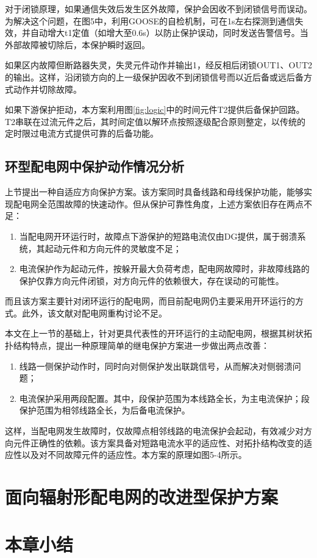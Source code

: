 对于闭锁原理，如果通信失效后发生区外故障，保护会因收不到闭锁信号而误动\cite{shengshi1981}。为解决这个问题，在图5中，利用GOOSE的自检机制，可在1s左右探测到通信失效，并自动增大t1定值（如增大至0.6s）以防止保护误动，同时发送告警信号。当外部故障被切除后，本保护瞬时返回。

如果区内故障但断路器失灵，失灵元件动作并输出1，经反相后闭锁OUT1、OUT2的输出。这样，沿闭锁方向的上一级保护因收不到闭锁信号而以近后备或远后备方式动作并切除故障。

如果下游保护拒动，本方案利用图\ref{fig:logic}中的时间元件T2提供后备保护回路。T2串联在过流元件之后，其时间定值以解环点按照逐级配合原则整定，以传统的定时限过电流方式提供可靠的后备功能。

\subsection{环型配电网中保护动作情况分析}

上节提出一种自适应方向保护方案。该方案同时具备线路和母线保护功能，能够实现配电网全范围故障的快速动作。但从保护可靠性角度，上述方案依旧存在两点不足：

\begin{enumerate}
    \item 当配电网开环运行时，故障点下游保护的短路电流仅由DG提供，属于弱溃系统，其起动元件和方向元件的灵敏度不足；
    \item 电流保护作为起动元件，按躲开最大负荷考虑，配电网故障时，非故障线路的保护仅靠方向元件闭锁，对方向元件的依赖很大，存在误动的可能性。
\end{enumerate}

而且该方案主要针对闭环运行的配电网，而目前配电网仍主要采用开环运行的方式。此外，该文献对配电网重构讨论不足。

本文在上一节的基础上，针对更具代表性的开环运行的主动配电网，根据其树状拓扑结构特点，提出一种原理简单的继电保护方案进一步做出两点改善：

\begin{enumerate}
    \item 线路一侧保护动作时，同时向对侧保护发出联跳信号，从而解决对侧弱溃问题；
    \item 电流保护采用两段配置。其中，\uppercase\expandafter{}段保护范围为本线路全长，为主电流保护；\uppercase\expandafter{}段保护范围为相邻线路全长，为后备电流保护。
\end{enumerate}

这样，当配电网发生故障时，仅故障点相邻线路的电流保护会起动，有效减少对方向元件正确性的依赖。该方案具备对短路电流水平的适应性、对拓扑结构改变的适应性以及对不同故障元件的适应性。本方案的原理如图5-4所示。


\section{面向辐射形配电网的改进型保护方案}

\section{本章小结}